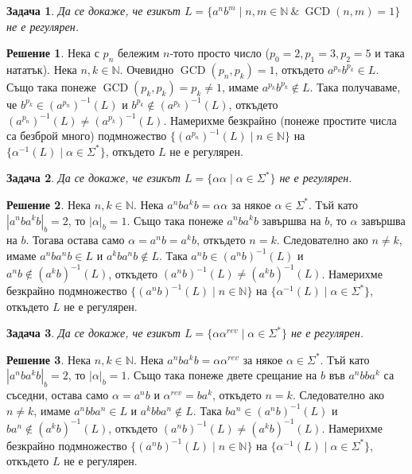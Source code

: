 \documentclass{article}
\newtheorem{problem}{Задача}[section]
\theoremstyle{definition}
\newtheorem*{solution}{Решение}
\begin{document}
\begin{problem}
Да се докаже, че езикът $L = \{ a^n b^m \mid n, m \in \mathbb{N} \: \& \: \operatorname{GCD}(n, m) = 1 \}$ не е регулярен.
\end{problem}

\begin{solution}
    Нека с $p_n$ бележим $n$-тото просто число ($p_0 = 2, p_1 = 3, p_2 = 5$ и така нататък).
    Нека $n, k \in \mathbb{N}$. Очевидно $\operatorname{GCD}(p_n, p_k) = 1$, откъдето $a^{p_n}b^{p_k} \in L$.
    Също така понеже $\operatorname{GCD}(p_k, p_k) = p_k \neq 1$, имаме $a^{p_k}b^{p_k} \notin L$.
    Така получаваме, че $b^{p_k} \in (a^{p_n})^{-1}(L)$ и $b^{p_k} \notin (a^{p_k})^{-1}(L)$, откъдето $(a^{p_n})^{-1}(L) \neq (a^{p_k})^{-1}(L)$.
    Намерихме безкрайно (понеже простите числа са безброй много) подмножество $\{ (a^{p_n})^{-1}(L) \mid n \in \mathbb{N} \}$ на $\{ \alpha^{-1}(L) \mid \alpha \in \Sigma^* \}$, откъдето $L$ не е регулярен.
\end{solution}

\begin{problem}
Да се докаже, че езикът $L = \{ \alpha \alpha \mid \alpha \in \Sigma^* \}$ не е регулярен.
\end{problem}

\begin{solution}
    Нека $n, k \in \mathbb{N}$.
    Нека $a^nba^kb = \alpha \alpha$ за някое $\alpha \in \Sigma^*$.
    Тъй като $|a^nba^kb|_b = 2$, то $|\alpha|_b = 1$.
    Също така понеже $a^nba^kb$ завършва на $b$, то $\alpha$ завършва на $b$.
    Тогава остава само $\alpha = a^nb = a^kb$, откъдето $n = k$.
    Следователно ако $n \neq k$, имаме $a^nba^nb \in L$ и $a^kba^nb \notin L$.
    Така $a^nb \in (a^nb)^{-1}(L)$ и $a^nb \notin (a^kb)^{-1}(L)$, откъдето $(a^nb)^{-1}(L) \neq (a^kb)^{-1}(L)$.
    Намерихме безкрайно подмножество $\{ (a^nb)^{-1}(L) \mid n \in \mathbb{N} \}$ на $\{ \alpha^{-1}(L) \mid \alpha \in \Sigma^* \}$, откъдето $L$ не е регулярен.
\end{solution}

\begin{problem}
Да се докаже, че езикът $L = \{ \alpha \alpha^{rev} \mid \alpha \in \Sigma^* \}$ не е регулярен.
\end{problem}

\begin{solution}
    Нека $n, k \in \mathbb{N}$.
    Нека $a^nba^kb = \alpha \alpha^{rev}$ за някое $\alpha \in \Sigma^*$.
    Тъй като $|a^nba^kb|_b = 2$, то $|\alpha|_b = 1$.
    Също така понеже двете срещание на $b$ във $a^nbba^k$ са съседни, остава само $\alpha = a^nb$ и $\alpha^{rev} = ba^k$, откъдето $n = k$.
    Следователно ако $n \neq k$, имаме $a^nbba^n \in L$ и $a^kbba^n \notin L$.
    Така $ba^n \in (a^nb)^{-1}(L)$ и $ba^n \notin (a^kb)^{-1}(L)$, откъдето $(a^nb)^{-1}(L) \neq (a^kb)^{-1}(L)$.
    Намерихме безкрайно подмножество $\{ (a^nb)^{-1}(L) \mid n \in \mathbb{N} \}$ на $\{ \alpha^{-1}(L) \mid \alpha \in \Sigma^* \}$, откъдето $L$ не е регулярен.
\end{solution}
\end{document}
